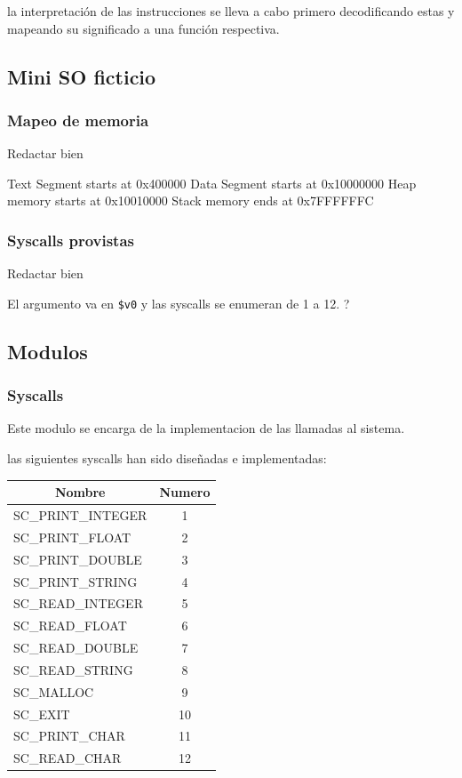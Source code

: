 \documentclass[12pt]{article}
\begin{document}
la interpretación de las instrucciones se lleva a cabo primero decodificando
estas y mapeando su significado a una función respectiva.
\subsection{Mini SO ficticio}
\subsubsection{Mapeo de memoria}
Redactar bien

Text Segment starts at 0x400000
Data Segment starts at 0x10000000
Heap memory starts at 0x10010000
Stack memory ends at 0x7FFFFFFC
\subsubsection{Syscalls provistas}
Redactar bien

El argumento va en \texttt{\$v0} y las syscalls se enumeran de 1 a 12. ?

\subsection{Modulos}
\subsubsection{Syscalls}
Este modulo se encarga de la implementacion de las llamadas al sistema.

las siguientes syscalls han sido diseñadas e implementadas:

\begin{table}[H]
\centering
\begin{tabular}{@{}lc@{}}
\toprule
\multicolumn{1}{c}{Nombre} & Numero \\ \midrule
SC\_PRINT\_INTEGER                        & 1      \\
SC\_PRINT\_FLOAT                        & 2      \\
SC\_PRINT\_DOUBLE                        & 3      \\
SC\_PRINT\_STRING                       & 4      \\
SC\_READ\_INTEGER                        & 5      \\
SC\_READ\_FLOAT                        & 6      \\
SC\_READ\_DOUBLE                        & 7      \\
SC\_READ\_STRING                       & 8      \\
SC\_MALLOC                       & 9      \\
SC\_EXIT                       & 10      \\
SC\_PRINT\_CHAR                       & 11      \\
SC\_READ\_CHAR                       & 12      \\
\end{tabular}%
\end{table}
\end{document}
